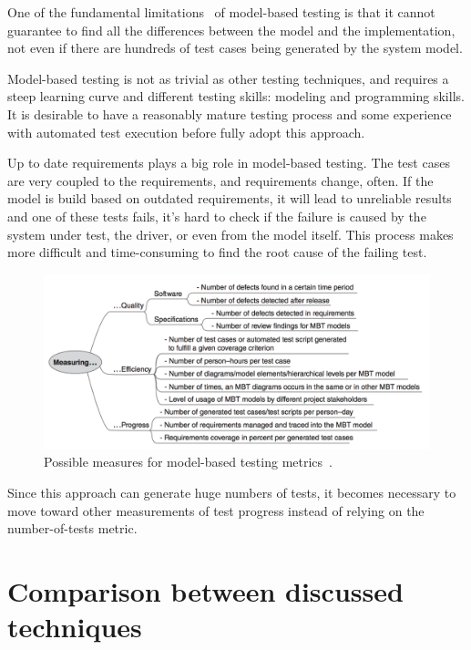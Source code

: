 One of the fundamental limitations~\cite{1200168} of model-based testing is that it cannot guarantee to find all the differences between the model and the implementation, not even if there are hundreds of test cases being generated by the system model.

Model-based testing is not as trivial as other testing techniques, and requires a steep learning curve and different testing skills: modeling and programming skills. It is desirable to have a reasonably mature testing process and some experience with automated test execution before fully adopt this approach.

Up to date requirements plays a big role in model-based testing. The test cases are very coupled to the requirements, and requirements change, often. If the model is build based on outdated requirements, it will lead to unreliable results and one of these tests fails, it's hard to check if the failure is caused by the system under test, the driver, or even from the model itself. This process makes more difficult and time-consuming to find the root cause of the failing test.

\begin{figure}[!htb]
\centering
\includegraphics[scale=0.5]{metrics.png}
\caption{Possible measures for model-based testing metrics~\cite{Kramer2016}.} \label{fig:metrics}
\end{figure}

Since this approach can generate huge numbers of tests, it becomes necessary to move toward other measurements of test progress instead of relying on the number-of-tests metric.

\section{Comparison between discussed techniques}

